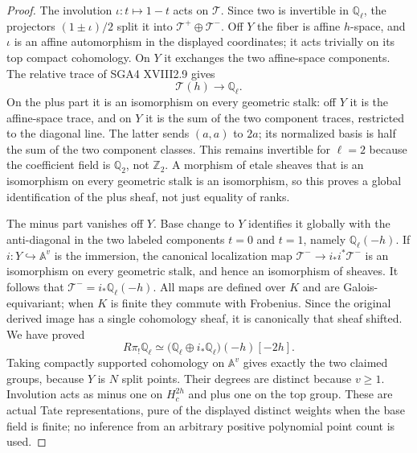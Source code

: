\begin{proof}
The involution $\iota:t\mapsto1-t$ acts on $\mathcal T$. Since two is invertible in $\mathbb Q_\ell$, the projectors $(1\pm\iota)/2$ split it into $\mathcal T^+\oplus\mathcal T^-$. Off $Y$ the fiber is affine $h$-space, and $\iota$ is an affine automorphism in the displayed coordinates; it acts trivially on its top compact cohomology. On $Y$ it exchanges the two affine-space components. The relative trace of SGA4 XVIII2.9 gives
\[
                  \mathcal T(h)\longrightarrow\mathbb Q_\ell.
\]
On the plus part it is an isomorphism on every geometric stalk: off $Y$ it is the affine-space trace, and on $Y$ it is the sum of the two component traces, restricted to the diagonal line. The latter sends $(a,a)$ to $2a$; its normalized basis is half the sum of the two component classes. This remains invertible for $\ell=2$ because the coefficient field is $\mathbb Q_2$, not $\mathbb Z_2$. A morphism of etale sheaves that is an isomorphism on every geometric stalk is an isomorphism, so this proves a global identification of the plus sheaf, not just equality of ranks.

The minus part vanishes off $Y$. Base change to $Y$ identifies it globally with the anti-diagonal in the two labeled components $t=0$ and $t=1$, namely $\mathbb Q_\ell(-h)$. If $i:Y\hookrightarrow\mathbb A^v$ is the immersion, the canonical localization map $\mathcal T^-\to i_*i^*\mathcal T^-$ is an isomorphism on every geometric stalk, and hence an isomorphism of sheaves. It follows that $\mathcal T^-=i_*\mathbb Q_\ell(-h)$. All maps are defined over $K$ and are Galois-equivariant; when $K$ is finite they commute with Frobenius. Since the original derived image has a single cohomology sheaf, it is canonically that sheaf shifted. We have proved
\[
 R\pi_!\mathbb Q_\ell
  \simeq\bigl(\mathbb Q_\ell\oplus i_*\mathbb Q_\ell\bigr)(-h)[-2h].
\]
Taking compactly supported cohomology on $\mathbb A^v$ gives exactly the two claimed groups, because $Y$ is $N$ split points. Their degrees are distinct because $v\geq1$. Involution acts as minus one on $H_c^{2h}$ and plus one on the top group. These are actual Tate representations, pure of the displayed distinct weights when the base field is finite; no inference from an arbitrary positive polynomial point count is used.


\end{proof}
